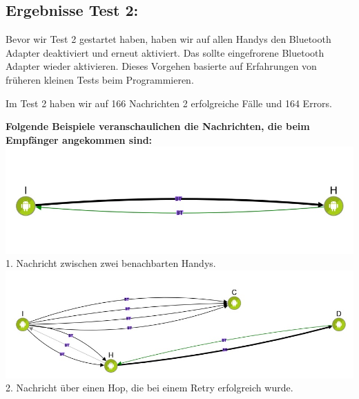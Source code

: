 \clearpage\subsection{Ergebnisse Test 2:}\label{ergebnisse-test-2}

Bevor wir Test 2 gestartet haben, haben wir auf allen Handys den
Bluetooth Adapter deaktiviert und erneut aktiviert. Das sollte
eingefrorene Bluetooth Adapter wieder aktivieren. Dieses Vorgehen
basierte auf Erfahrungen von früheren kleinen Tests beim Programmieren.

Im Test 2 haben wir auf 166 Nachrichten 2 erfolgreiche Fälle und 164
Errors.

\textbf{Folgende Beispiele veranschaulichen die Nachrichten, die beim
Empfänger angekommen sind:}
\includegraphics{belege/grosstests/Bilder/Test2Erfolg1.jpg} 1. Nachricht
zwischen zwei benachbarten Handys.
\includegraphics{belege/grosstests/Bilder/Test2Erfolg2.jpg} 2. Nachricht
über einen Hop, die bei einem Retry erfolgreich wurde.

